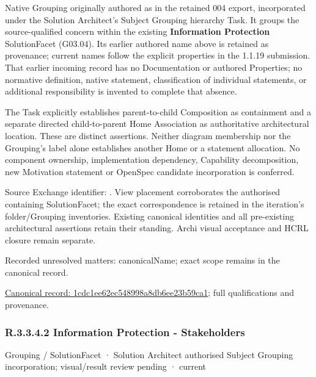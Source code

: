 Native Grouping originally authored as \texttt{} in the retained 004 export,
incorporated under the Solution Architect's Subject Grouping hierarchy Task.
It groups the source-qualified \texttt{} concern within
the existing \textbf{Information Protection} SolutionFacet (G03.04). Its earlier authored name above is retained as provenance; current names
follow the explicit properties in the 1.1.19 submission.
That earlier incoming record has no Documentation or authored Properties; no normative
definition, native statement, classification of individual statements, or
additional responsibility is invented to complete that absence.



The Task explicitly establishes parent-to-child Composition as containment and
a separate directed child-to-parent Home Association as authoritative architectural
location. These are distinct assertions. Neither diagram membership nor the
Grouping's label alone establishes another Home or a statement allocation.
No component ownership, implementation dependency, Capability decomposition,
new Motivation statement or OpenSpec candidate incorporation is conferred.



Source Exchange identifier: \texttt{}. View placement corroborates
the authorised containing SolutionFacet; the exact correspondence is retained in the
iteration's folder/Grouping inventories. Existing canonical identities and all
pre-existing architectural assertions retain their standing. Archi visual
acceptance and HCRL closure remain separate.


{\small Recorded unresolved matters: canonicalName; exact scope remains in the canonical record.}\par
{\footnotesize \href{../../../../../../../continuum/grouping/1cdc1ee62ec548998a8db6ee23b59ca1.md}{Canonical record: 1cdc1ee62ec548998a8db6ee23b59ca1}; full qualifications and provenance.}\par
\subsubsection*{R.3.3.4.2 Information Protection - Stakeholders}
\label{navigation:R.3.3.4.2}

\label{element:66ec039ab4f042a8b4817ca1dafaedfe}
{\small Grouping / SolutionFacet · Solution Architect authorised Subject Grouping incorporation; visual/result review pending · current}\par

